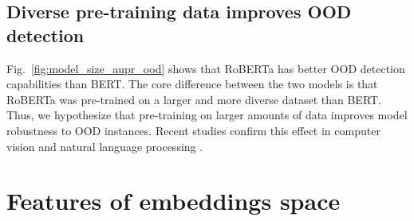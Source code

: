 \documentclass[letterpaper, final]{article} %
\begin{document}
\subsection{Diverse pre-training data improves OOD detection}

Fig.~\ref{fig:model_size_aupr_ood} shows that RoBERTa has better OOD detection capabilities than BERT. The core difference between the two models is that RoBERTa was pre-trained on a larger and more diverse dataset than BERT. Thus, we hypothesize that pre-training on larger amounts of data improves model robustness to OOD instances. Recent studies confirm this effect in computer vision \cite{hendrycks_pretraining19,orhan2019robustness} and natural language processing \cite{Hendrycks2020PretrainedTI}.

\section{Features of embeddings space}
\end{document}
